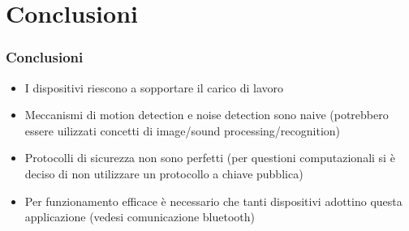 \documentclass{beamer}
\begin{document}
\section{Conclusioni}
\begin{frame}
\frametitle{Conclusioni}
\begin{itemize}
  \item I dispositivi riescono a sopportare il carico di lavoro
  \item Meccanismi di motion detection e noise detection sono naive (potrebbero essere uilizzati concetti di image/sound processing/recognition)
  \item Protocolli di sicurezza non sono perfetti (per questioni computazionali si è deciso di non utilizzare un protocollo a chiave pubblica)
  \item Per funzionamento efficace è necessario che tanti dispositivi adottino questa applicazione (vedesi comunicazione bluetooth)
\end{itemize}
\end{frame}
\end{document}
